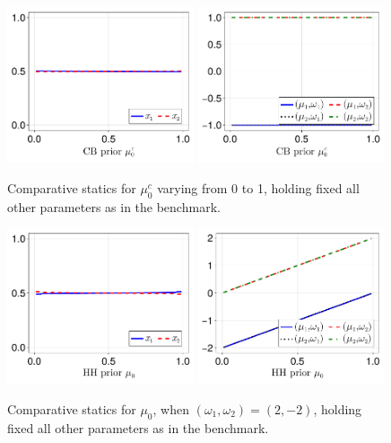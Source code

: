 \documentclass[12pt,a4paper]{article}
\begin{document}
\begin{figure}[H]
\centering
\includegraphics[width=0.49\textwidth]{figures/V8/γ_1/fig_optimal_π_across_μ_0_c_ω_1_1_ω_2_-1_δ_0.5_.pdf}
\includegraphics[width=0.49\textwidth]{figures/V8/γ_1/fig_posterior_across_μ_0_c_ω_1_1_ω_2_-1_δ_0.5_.pdf}
\caption{Comparative statics for $\mu_0^c$ varying from 0 to 1, holding fixed all other parameters as in the benchmark.}
\label{Figure4}
\end{figure}


\begin{figure}[H]
\centering
\includegraphics[width=0.49\textwidth]{figures/V8/γ_1/fig_optimal_π_across_μ_0_ω_1_2_ω_2_-2_δ_0.5_.pdf}
\includegraphics[width=0.49\textwidth]{figures/V8/γ_1/fig_posterior_across_μ_0_ω_1_2_ω_2_-2_δ_0.5_.pdf}
\caption{Comparative statics for $\mu_0$, when $(\omega_1,\omega_2)=(2,-2)$, holding fixed all other parameters as in the benchmark.}
\label{FigureA17}
\end{figure}
\end{document}
